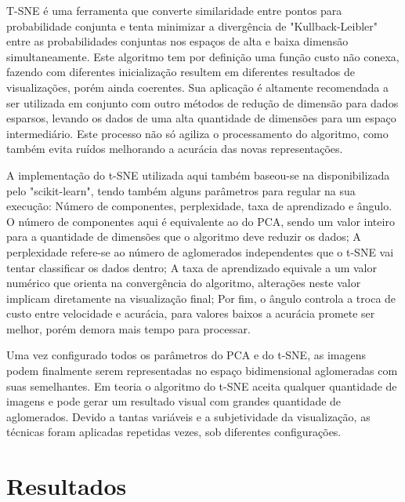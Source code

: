 \documentclass[12pt]{report}
\begin{document}

T-SNE é uma ferramenta que converte similaridade entre pontos para probabilidade conjunta e tenta minimizar a divergência de "Kullback-Leibler" entre as probabilidades conjuntas nos espaços de alta e baixa dimensão simultaneamente.  Este algoritmo tem por definição uma função custo não conexa, fazendo com diferentes inicialização resultem em diferentes resultados de visualizações, porém ainda coerentes. Sua aplicação é altamente recomendada a ser utilizada em conjunto com outro métodos de redução de dimensão para dados esparsos, levando os dados de uma alta quantidade de dimensões para um espaço intermediário. Este processo não só agiliza o processamento do algoritmo, como também evita ruídos melhorando a acurácia das novas representações. %

A implementação do t-SNE utilizada aqui também baseou-se na disponibilizada pelo "scikit-learn", tendo também alguns parâmetros para regular na sua execução: Número de componentes, perplexidade, taxa de aprendizado e ângulo. O número de componentes aqui é equivalente ao do PCA, sendo um valor inteiro para a quantidade de dimensões que o algoritmo deve reduzir os dados; A perplexidade refere-se ao número de aglomerados independentes que o t-SNE vai tentar classificar os dados dentro; A taxa de aprendizado equivale a um valor numérico que orienta na convergência do algoritmo, alterações neste valor implicam diretamente na visualização final; Por fim, o ângulo controla a troca de custo entre velocidade e acurácia, para valores baixos a acurácia promete ser melhor, porém demora mais tempo para processar. 

Uma vez configurado todos os parâmetros do PCA e do t-SNE, as imagens podem finalmente serem representadas no espaço bidimensional aglomeradas com suas semelhantes. Em teoria o algoritmo do t-SNE aceita qualquer quantidade de imagens e pode gerar um resultado visual com grandes quantidade de aglomerados. Devido a tantas variáveis e a subjetividade da visualização, as técnicas foram aplicadas repetidas vezes, sob diferentes configurações.

\chapter{Resultados}
\label{cha:resultados}

\end{document}
